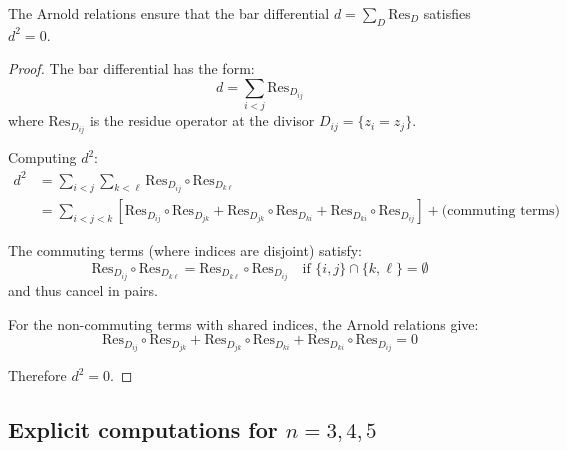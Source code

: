 \begin{corollary}
\label{cor:nilpotency-arnold-comprehensive}
The Arnold relations ensure that the bar differential $d = \sum_{D} \text{Res}_D$ 
satisfies $d^2 = 0$.
\end{corollary}

\begin{proof}
The bar differential has the form:
\begin{equation}
d = \sum_{i < j} \text{Res}_{D_{ij}}
\end{equation}
where $\text{Res}_{D_{ij}}$ is the residue operator at the divisor $D_{ij} = \{z_i = z_j\}$.

Computing $d^2$:
\begin{align}
d^2 &= \sum_{i<j} \sum_{k<\ell} \text{Res}_{D_{ij}} \circ \text{Res}_{D_{k\ell}}\\
&= \sum_{i<j<k} \left[\text{Res}_{D_{ij}} \circ \text{Res}_{D_{jk}} + \text{Res}_{D_{jk}} 
\circ \text{Res}_{D_{ki}} + \text{Res}_{D_{ki}} \circ \text{Res}_{D_{ij}}\right] + 
\text{(commuting terms)}
\end{align}

The commuting terms (where indices are disjoint) satisfy:
\begin{equation}
\text{Res}_{D_{ij}} \circ \text{Res}_{D_{k\ell}} = \text{Res}_{D_{k\ell}} \circ 
\text{Res}_{D_{ij}} \quad \text{if } \{i,j\} \cap \{k,\ell\} = \emptyset
\end{equation}
and thus cancel in pairs.

For the non-commuting terms with shared indices, the Arnold relations give:
\begin{equation}
\text{Res}_{D_{ij}} \circ \text{Res}_{D_{jk}} + \text{Res}_{D_{jk}} \circ \text{Res}_{D_{ki}} 
+ \text{Res}_{D_{ki}} \circ \text{Res}_{D_{ij}} = 0
\end{equation}

Therefore $d^2 = 0$.
\end{proof}

\subsection{\texorpdfstring{Explicit computations for $n = 3, 4, 5$}{Explicit computations for n = 3, 4, 5}}
\label{sec:arnold-explicit-n2345}

